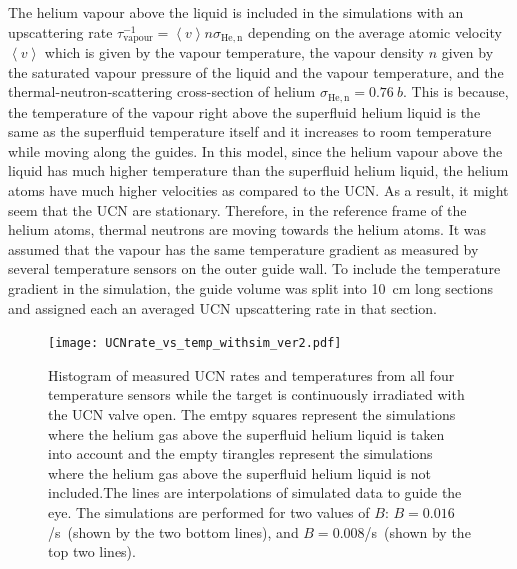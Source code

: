 The helium vapour above the liquid is included in the simulations with
an upscattering rate
$\tau^{-1}_\mathrm{vapour} = \left< v \right> n \sigma_\mathrm{He,n}$
depending on the average atomic velocity $\left < v \right>$ which is
given by the vapour temperature, the vapour density $n$ given by the
saturated vapour pressure of the liquid and the vapour temperature,
and the thermal-neutron-scattering cross-section of helium
$\sigma_\mathrm{He,n} = 0.76~b$. This is because, the temperature of
the vapour right above the superfluid helium liquid is the same as the
superfluid temperature itself and it increases to room temperature
while moving along the guides. In this model, since the helium vapour
above the liquid has much higher temperature than the superfluid
helium liquid, the helium atoms have much higher velocities as
compared to the UCN. As a result, it might seem that the UCN are
stationary. Therefore, in the reference frame of the helium atoms,
thermal neutrons are moving towards the helium atoms.  It was assumed
that the vapour has the same temperature gradient as measured by
several temperature sensors on the outer guide wall. To include the
temperature gradient in the simulation, the guide volume was split
into 10~cm long sections and assigned each an averaged UCN
upscattering rate in that section.



\begin{figure}[h!]
  \centering
  \texttt{[image: UCNrate\_vs\_temp\_withsim\_ver2.pdf]}
  \caption{Histogram of measured UCN rates and temperatures from all
    four temperature sensors while the target is continuously
    irradiated with the UCN valve open. The emtpy squares represent
    the simulations where the helium gas above the superfluid helium
    liquid is taken into account and the empty tirangles represent the
    simulations where the helium gas above the superfluid helium
    liquid is not included.The lines are interpolations of simulated
    data to guide the eye. The simulations are performed for two
    values of $B$: $B = 0.016$/s~(shown by the two bottom lines), and
    $B = 0.008$/s~(shown by the top two lines). }
  \label{fig:rate_vs_temp_sim}
\end{figure}



